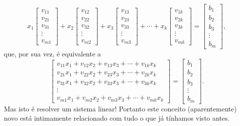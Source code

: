 \begin{equation}
x_1 \left[
\begin{array}{c}
v_{11} \\
v_{21} \\
v_{31} \\
\vdots \\
v_{m1}
\end{array}
\right] + x_2
\left[
\begin{array}{c}
v_{12} \\
v_{22} \\
v_{32} \\
\vdots \\
v_{m2}
\end{array}
\right] + x_3
\left[
\begin{array}{c}
v_{13} \\
v_{23} \\
v_{33} \\
\vdots \\
v_{m3}
\end{array}
\right] + \cdots + x_k
\left[
\begin{array}{c}
v_{1k} \\
v_{2k} \\
v_{3k} \\
\vdots \\
v_{mk}
\end{array}
\right] =
\left[
\begin{array}{c}
b_{1} \\
b_{2} \\
b_{3} \\
\vdots \\
b_{m}
\end{array}
\right],
\end{equation} que, por sua vez, é equivalente a
\begin{equation}
\left[
\begin{array}{c}
v_{11} x_1 + v_{12} x_2 + v_{13} x_3 + \cdots + v_{1k} x_k  \\
v_{21} x_1 + v_{22} x_2 + v_{23} x_3 + \cdots + v_{2k} x_k  \\
v_{31} x_1 + v_{32} x_2 + v_{33} x_3 + \cdots + v_{3k} x_k  \\
\vdots  \\
v_{m1} x_1 + v_{m2} x_2 + v_{m3} x_3 + \cdots + v_{mk} x_k
\end{array}
\right] =
\left[
\begin{array}{c}
b_{1} \\
b_{2} \\
b_{3} \\
\vdots \\
b_{m}
\end{array}
\right].
\end{equation} Mas isto é resolver um sistema linear! Portanto este conceito (aparentemente) novo está intimamente relacionado com tudo o que já tínhamos visto antes.



